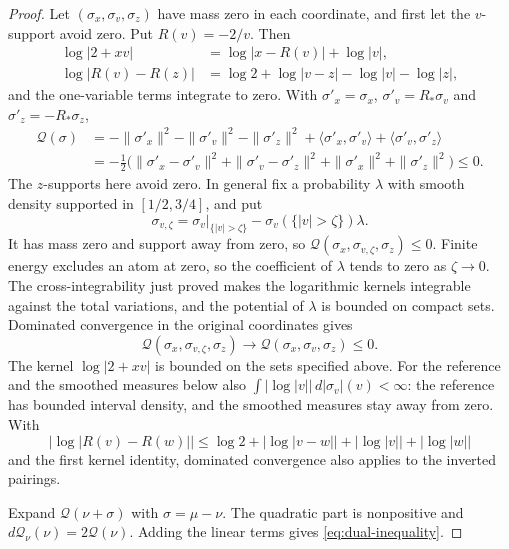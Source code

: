 \documentclass{amsart}
\numberwithin{equation}{section}
\numberwithin{table}{section}
\begin{document}
\begin{proof}
Let $(\sigma_x,\sigma_v,\sigma_z)$ have mass zero in each coordinate, and
first let the $v$-support avoid zero. Put $R(v)=-2/v$. Then
\begin{align*}
 \log|2+xv|&=\log|x-R(v)|+\log|v|,\\
 \log|R(v)-R(z)|&=\log2+\log|v-z|-\log|v|-\log|z|,
\end{align*}
and the one-variable terms integrate to zero. With $\sigma'_x=\sigma_x$,
$\sigma'_v=R_*\sigma_v$ and $\sigma'_z=-R_*\sigma_z$,
\begin{align*}
 \mathcal Q(\sigma)
 &=-\|\sigma'_x\|^2-\|\sigma'_v\|^2-\|\sigma'_z\|^2
          +\langle \sigma'_x,\sigma'_v\rangle+\langle \sigma'_v,\sigma'_z\rangle\\
 &=-\tfrac12\bigl(\|\sigma'_x-\sigma'_v\|^2+\|\sigma'_v-\sigma'_z\|^2+\|\sigma'_x\|^2+\|\sigma'_z\|^2\bigr)\le0.
\end{align*}
The $z$-supports here avoid zero. In general fix a probability $\lambda$
with smooth density supported in $[1/2,3/4]$, and put
\[
 \sigma_{v,\zeta}
 =\sigma_v|_{\{|v|>\zeta\}}
   -\sigma_v(\{|v|>\zeta\})\lambda.
\]
It has mass zero and support away from zero, so
$\mathcal Q(\sigma_x,\sigma_{v,\zeta},\sigma_z)\le0$. Finite energy excludes
an atom at zero, so the coefficient of $\lambda$ tends to zero as
$\zeta\to0$. The cross-integrability just proved makes the logarithmic
kernels integrable against the total variations, and the potential of
$\lambda$ is bounded on compact sets. Dominated convergence in the original
coordinates gives
\[
 \mathcal Q(\sigma_x,\sigma_{v,\zeta},\sigma_z)
 \longrightarrow\mathcal Q(\sigma_x,\sigma_v,\sigma_z)\le0.
\]
The kernel $\log|2+xv|$ is bounded on the sets specified above. For the
reference and the smoothed measures below also
$\int|\log|v||\,d|\sigma_v|(v)<\infty$: the reference has bounded interval
density, and the smoothed measures stay away from zero. With
\[
 |\log|R(v)-R(w)||\le\log2+|\log|v-w||+|\log|v||+|\log|w||
\]
and the first kernel identity, dominated convergence also applies to the
inverted pairings.

Expand $\mathcal Q(\nu+\sigma)$ with $\sigma=\mu-\nu$. The quadratic part
is nonpositive and $d\mathcal Q_\nu(\nu)=2\mathcal Q(\nu)$. Adding the
linear terms gives \eqref{eq:dual-inequality}.
\end{proof}
\end{document}
